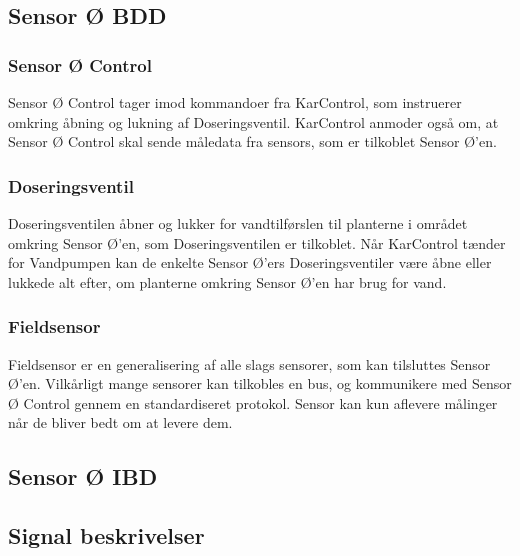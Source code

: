 
\subsection{Sensor Ø BDD}

\subsubsection*{Sensor Ø Control}
Sensor Ø Control tager imod kommandoer fra KarControl, som instruerer omkring åbning og lukning af Doseringsventil. KarControl anmoder også om, at Sensor Ø Control skal sende måledata fra sensors, som er tilkoblet Sensor Ø’en.

\subsubsection{Doseringsventil}
Doseringsventilen åbner og lukker for vandtilførslen til planterne i området omkring Sensor Ø’en, som Doseringsventilen er tilkoblet. Når KarControl tænder for Vandpumpen kan de enkelte Sensor Ø’ers Doseringsventiler være åbne eller lukkede alt efter, om planterne omkring Sensor Ø’en har brug for vand.

\subsubsection{Fieldsensor}
Fieldsensor er en generalisering af alle slags sensorer, som kan tilsluttes Sensor Ø’en. Vilkårligt mange sensorer kan tilkobles en bus, og kommunikere med Sensor Ø Control gennem en standardiseret protokol. Sensor kan kun aflevere målinger når de bliver bedt om at levere dem.

\subsection{Sensor Ø IBD}


\subsection{Signal beskrivelser}
